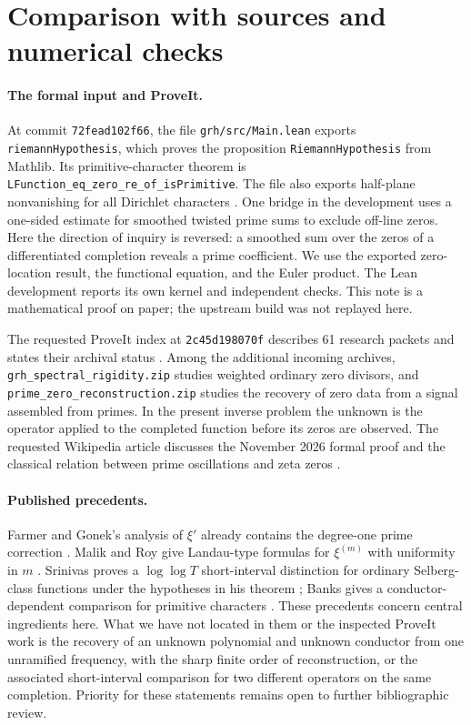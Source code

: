 \documentclass[11pt,letterpaper]{article}
\begin{document}
\section{Comparison with sources and numerical checks}
\paragraph{The formal input and ProveIt.}
At commit \texttt{72fead102f66}, the file \texttt{grh/src/Main.lean}
exports \texttt{riemannHypothesis}, which proves the proposition
\texttt{RiemannHypothesis} from Mathlib. Its primitive-character theorem
is \texttt{LFunction\_\allowbreak eq\_\allowbreak zero\_\allowbreak re\_\allowbreak of\_\allowbreak isPrimitive}.
The file also exports half-plane nonvanishing for all Dirichlet characters
\cite{lean}.
One bridge in the development uses a one-sided estimate for smoothed
twisted prime sums to exclude off-line zeros. Here the direction of
inquiry is reversed: a smoothed sum over the zeros of a differentiated
completion reveals a prime coefficient. We use the exported zero-location
result, the functional equation, and the Euler product. The Lean
development reports its own kernel and independent checks. This note is
a mathematical proof on paper; the upstream build was not replayed here.

The requested ProveIt index at \texttt{2c45d198070f} describes 61 research
packets and states their archival status \cite{proveit}. Among the additional
incoming archives, \texttt{grh\_spectral\_rigidity.zip} studies weighted
ordinary zero divisors, and \texttt{prime\_zero\_reconstruction.zip}
studies the recovery of zero data from a signal assembled from primes.
In the present inverse problem the unknown is the operator applied to the
completed function before its zeros are observed. The requested Wikipedia
article discusses the November 2026 formal proof and the classical
relation between prime oscillations and zeta zeros \cite{wiki}.

\paragraph{Published precedents.}
Farmer and Gonek's analysis of $\xi'$ already contains the degree-one
prime correction \cite[Lemma 3.1]{fg}. Malik and Roy give Landau-type
formulas for $\xi^{(m)}$ with uniformity in $m$ \cite[Theorem 1.3]{mr}.
Srinivas proves a $\log\log T$ short-interval distinction for ordinary
Selberg-class functions under the hypotheses in his theorem \cite{sr};
Banks gives a conductor-dependent comparison for primitive characters
\cite{banks}. These precedents concern central ingredients here.
What we have not located in them or the inspected ProveIt work is the
recovery of an unknown polynomial and unknown conductor from one
unramified frequency, with the sharp finite order of reconstruction,
or the associated short-interval comparison for two different operators
on the same completion. Priority for these statements remains open to
further bibliographic review.
\end{document}

